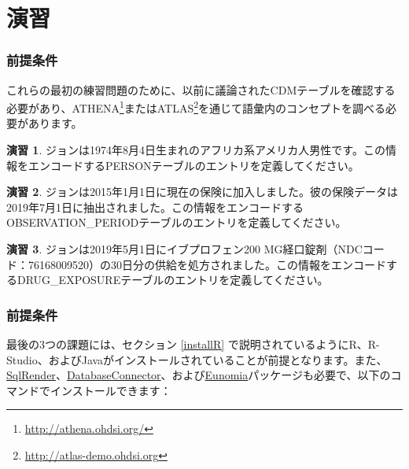 \documentclass[
  11pt]{book}
\theoremstyle{definition}
\theoremstyle{definition}
\theoremstyle{definition}
\newtheorem{exercise}{演習}[chapter]
\theoremstyle{definition}
\theoremstyle{remark}
\begin{document}
\section{演習}\label{ux6f14ux7fd2}

\subsubsection*{前提条件}\label{ux524dux63d0ux6761ux4ef6}

これらの最初の練習問題のために、以前に議論されたCDMテーブルを確認する必要があり、ATHENA\footnote{\url{http://athena.ohdsi.org/}}またはATLAS\footnote{\url{http://atlas-demo.ohdsi.org}}を通じて語彙内のコンセプトを調べる必要があります。

\begin{exercise}
\protect\hypertarget{exr:exerciseJohnPerson}{}\label{exr:exerciseJohnPerson}ジョンは1974年8月4日生まれのアフリカ系アメリカ人男性です。この情報をエンコードするPERSONテーブルのエントリを定義してください。
\end{exercise}

\begin{exercise}
\protect\hypertarget{exr:exerciseJohnOp}{}\label{exr:exerciseJohnOp}ジョンは2015年1月1日に現在の保険に加入しました。彼の保険データは2019年7月1日に抽出されました。この情報をエンコードするOBSERVATION\_PERIODテーブルのエントリを定義してください。
\end{exercise}

\begin{exercise}
\protect\hypertarget{exr:exerciseJohnDrug}{}\label{exr:exerciseJohnDrug}ジョンは2019年5月1日にイブプロフェン200 MG経口錠剤（NDCコード：76168009520）の30日分の供給を処方されました。この情報をエンコードするDRUG\_EXPOSUREテーブルのエントリを定義してください。
\end{exercise}

\subsubsection*{前提条件}\label{ux524dux63d0ux6761ux4ef6-1}

最後の3つの課題には、セクション \ref{installR} で説明されているようにR、R-Studio、およびJavaがインストールされていることが前提となります。また、\href{https://ohdsi.github.io/SqlRender/}{SqlRender}、\href{https://ohdsi.github.io/DatabaseConnector/}{DatabaseConnector}、および\href{https://ohdsi.github.io/Eunomia/}{Eunomia}パッケージも必要で、以下のコマンドでインストールできます：
\end{document}
